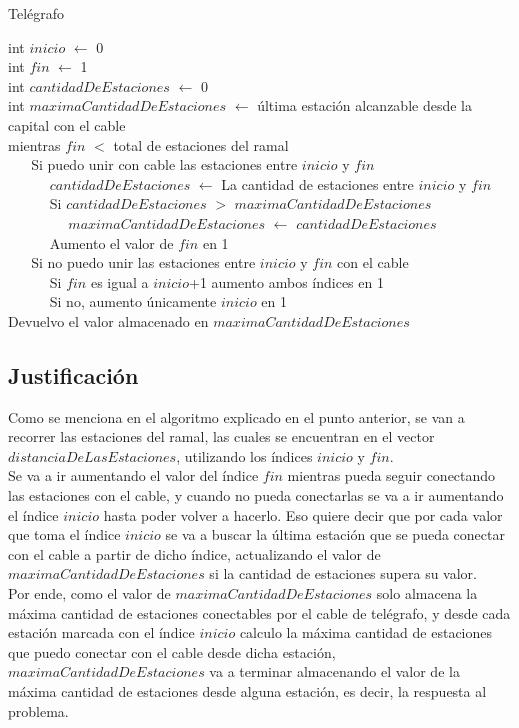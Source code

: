 \documentclass[10pt, a4paper]{article}
\begin{document}
\begin{algorithm}[H]
	\SetAlgoLined
	\caption{Tel\'egrafo}
	int $inicio$ $\leftarrow$ 0\\
	int $fin$ $\leftarrow$ 1\\
	int $cantidadDeEstaciones$ $\leftarrow$ 0\\
	int $maximaCantidadDeEstaciones$ $\leftarrow$ \'ultima estaci\'on alcanzable desde la capital con el cable\\
	mientras $fin$ $<$ total de estaciones del ramal\\
	 $\ \ \ \ \ \ $ Si puedo unir con cable las estaciones entre $inicio$ y $fin$\\
	 $\ \ \ \ \ \ \ \ \ \ \ \ $ $ cantidadDeEstaciones$ $\leftarrow$ La cantidad de estaciones entre $inicio$ y $fin$ \\
	 $\ \ \ \ \ \ \ \ \ \ \ \ $ Si $cantidadDeEstaciones$ $>$ $maximaCantidadDeEstaciones$\\
	 $\ \ \ \ \ \ \ \ \ \ \ \ \ \ \ \ \ \ $ $maximaCantidadDeEstaciones$ $\leftarrow$ $cantidadDeEstaciones$\\
	 $\ \ \ \ \ \ \ \ \ \ \ \ $ Aumento el valor de $fin$ en 1\\
	 $\ \ \ \ \ \ $ Si no puedo unir las estaciones entre $inicio$ y $fin$ con el cable\\
	 $\ \ \ \ \ \ \ \ \ \ \ \ $ Si $fin$ es igual a $inicio$+1 aumento ambos \'indices en 1\\
	 $\ \ \ \ \ \ \ \ \ \ \ \ $ Si no, aumento \'unicamente $inicio$ en 1\\
	 Devuelvo el valor almacenado en $maximaCantidadDeEstaciones$
\end{algorithm}

\subsection{Justificaci\'on}
Como se menciona en el algoritmo explicado en el punto anterior, se van a recorrer las estaciones del ramal, las cuales se encuentran en el vector $distanciaDeLasEstaciones$, utilizando los \'indices $inicio$ y $fin$. \\
Se va a ir aumentando el valor del \'indice $fin$ mientras pueda seguir conectando las estaciones con el cable, y cuando no pueda conectarlas se va a ir aumentando el \'indice $inicio$ hasta poder volver a hacerlo. Eso quiere decir que por cada valor que toma el \'indice $inicio$ se va a buscar la \'ultima estaci\'on que se pueda conectar con el cable a partir de dicho \'indice, actualizando el valor de $maximaCantidadDeEstaciones$ si la cantidad de estaciones supera su valor. \\
Por ende, como el valor de $maximaCantidadDeEstaciones$ solo almacena la m\'axima cantidad de estaciones conectables por el cable de tel\'egrafo, y desde cada estaci\'on marcada con el \'indice $inicio$ calculo la m\'axima cantidad de estaciones que puedo conectar con el cable desde dicha estaci\'on, $maximaCantidadDeEstaciones$ va a terminar almacenando el valor de la m\'axima cantidad de estaciones desde alguna estaci\'on, es decir, la respuesta al problema.
\end{document}
